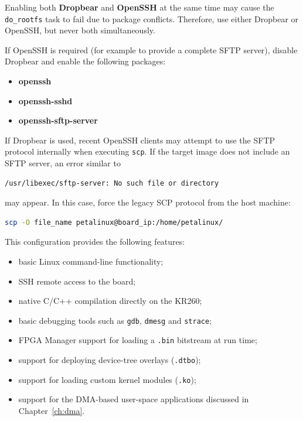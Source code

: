 Enabling both \textbf{Dropbear} and \textbf{OpenSSH} at the same time may cause
the \texttt{do\_rootfs} task to fail due to package conflicts. Therefore, use
either Dropbear or OpenSSH, but never both simultaneously.

If OpenSSH is required (for example to provide a complete SFTP server), disable
Dropbear and enable the following packages:
\begin{itemize}
	\item \textbf{openssh}
	\item \textbf{openssh-sshd}
	\item \textbf{openssh-sftp-server}
\end{itemize}

If Dropbear is used, recent OpenSSH clients may attempt to use the SFTP
protocol internally when executing \texttt{scp}. If the target image does not
include an SFTP server, an error similar to

\begin{lstlisting}[language=bash]
	/usr/libexec/sftp-server: No such file or directory
\end{lstlisting}

may appear. In this case, force the legacy SCP protocol from the host machine:

\begin{lstlisting}[language=bash]
	scp -O file_name petalinux@board_ip:/home/petalinux/
\end{lstlisting}


This configuration provides the following features:
\begin{itemize}
	\item basic Linux command-line functionality;
	\item SSH remote access to the board;
	\item native C/C++ compilation directly on the KR260;
	\item basic debugging tools such as \texttt{gdb}, \texttt{dmesg} and \texttt{strace};
	\item FPGA Manager support for loading a \texttt{.bin} bitstream at run time;
	\item support for deploying device-tree overlays (\texttt{.dtbo});
	\item support for loading custom kernel modules (\texttt{.ko});
	\item support for the DMA-based user-space applications discussed in Chapter~\ref{ch:dma}.
\end{itemize}

